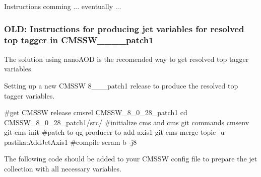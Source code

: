 Instructions comming ... eventually ...

\subsubsection*{O\-L\-D\-: Instructions for producing jet variables for resolved top tagger in C\-M\-S\-S\-W\-\_\-\_\-\_\-\_\-patch1}

The solution using nano\-A\-O\-D is the recomended way to get resolved top tagger variables.

Setting up a new C\-M\-S\-S\-W 8\-\_\-\_\-\_\-patch1 release to produce the resolved top tagger variables.


\begin{DoxyCode}
\textcolor{preprocessor}{#get CMSSW release}
\textcolor{preprocessor}{}cmsrel CMSSW\_8\_0\_28\_patch1
cd CMSSW\_8\_0\_28\_patch1/src/
\textcolor{preprocessor}{#initialize cms and cms git commands }
\textcolor{preprocessor}{}cmsenv
git cms-init
\textcolor{preprocessor}{#patch to qg producer to add axis1}
\textcolor{preprocessor}{}git cms-merge-topic -u pastika:AddJetAxis1
\textcolor{preprocessor}{#compile}
\textcolor{preprocessor}{scram b -j8}
\end{DoxyCode}


The following code should be added to your C\-M\-S\-S\-W config file to prepare the jet collection with all necessary variables.


